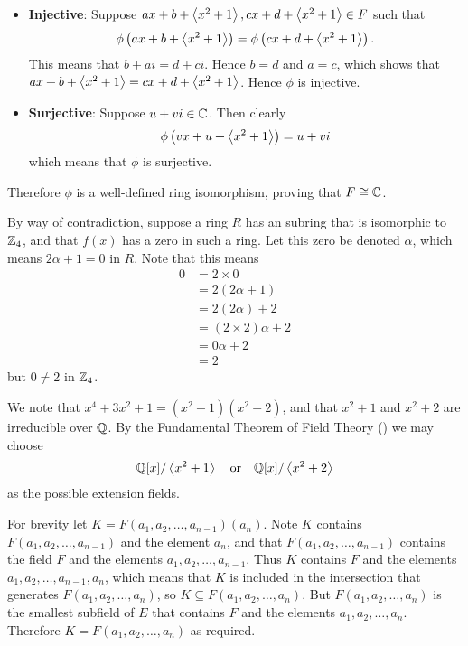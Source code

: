 \begin{questions}
\begin{itemize}
        \item \textbf{Injective}: Suppose $ax + b + \left\langle x^2+1\right\rangle, cx + d + \left\langle x^2+1\right\rangle \in F$ such that
        \[
            \phi\left(ax + b + \left\langle x^2+1\right\rangle\right) = \phi\left(cx + d + \left\langle x^2+1\right\rangle\right).
        \]
        This means that $b + ai = d + ci$. Hence $b = d$ and $a = c$, which shows that $ax + b + \left\langle x^2+1\right\rangle = cx + d + \left\langle x^2+1\right\rangle$. Hence $\phi$ is injective.

        \item \textbf{Surjective}: Suppose $u + vi \in \mathbb{C}$. Then clearly
        \[
            \phi\left(vx + u + \left\langle x^2+1\right\rangle\right) = u + vi
        \]
        which means that $\phi$ is surjective.
    \end{itemize}
    Therefore $\phi$ is a well-defined ring isomorphism, proving that $F \cong \mathbb{C}$.

    \item By way of contradiction, suppose a ring $R$ has an subring that is isomorphic to $\mathbb{Z}_4$, and that $f(x)$ has a zero in such a ring. Let this zero be denoted $\alpha$, which means $2\alpha + 1 = 0$ in $R$. Note that this means
    \begin{align*}
        0 &= 2\times0\\
        &= 2(2\alpha + 1)\\
        &= 2(2\alpha) + 2\\
        &= (2 \times 2)\alpha + 2\\
        &= 0\alpha + 2\\
        &= 2
    \end{align*}
    but $0 \neq 2$ in $\mathbb{Z}_4$.

    \item We note that $x^4 + 3x^2 + 1 = (x^2+1)(x^2+2)$, and that $x^2+1$ and $x^2 + 2$ are irreducible over $\mathbb{Q}$. By the Fundamental Theorem of Field Theory () we may choose
    \[
        \mathbb{Q}[x]/\left\langle x^2+1\right\rangle \quad\text{or}\quad \mathbb{Q}[x]/\left\langle x^2+2\right\rangle
    \]
    as the possible extension fields.

    \item For brevity let $K = F(a_1, a_2, \dots, a_{n-1})(a_n)$. Note $K$ contains $F(a_1, a_2, \dots, a_{n-1})$ and the element $a_n$, and that $F(a_1, a_2, \dots, a_{n-1})$ contains the field $F$ and the elements $a_1, a_2, \dots, a_{n-1}$. Thus $K$ contains $F$ and the elements $a_1, a_2, \dots, a_{n-1}, a_n$, which means that $K$ is included in the intersection that generates $F(a_1, a_2, \dots, a_n)$, so $K \subseteq F(a_1, a_2, \dots, a_n)$. But $F(a_1, a_2, \dots, a_n)$ is the smallest subfield of $E$ that contains $F$ and the elements $a_1, a_2, \dots, a_n$. Therefore $K = F(a_1, a_2, \dots, a_n)$ as required.


\end{questions}
